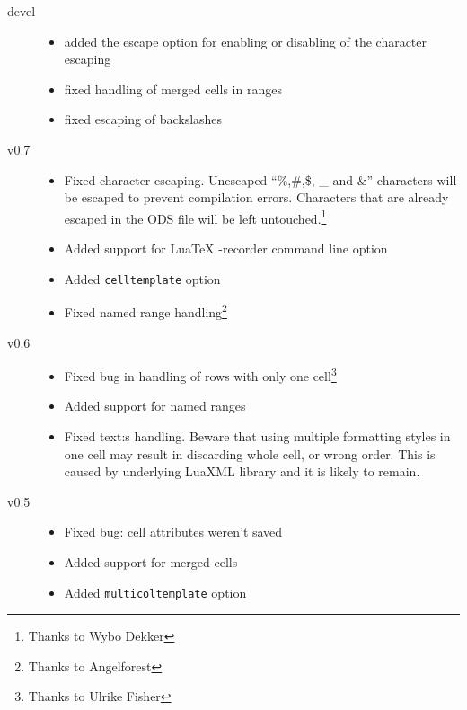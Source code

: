\documentclass{ltxdoc}
\begin{document}
\begin{description}
  \item[devel]
    \begin{itemize}
      \item added the escape option for enabling or disabling of the character escaping
      \item fixed handling of merged cells in ranges
      \item fixed escaping of backslashes
    \end{itemize}
   \item[v0.7]
     \begin{itemize}
       \item Fixed character escaping. Unescaped ``\%,\#,\$, \_ and \&'' characters will be escaped to prevent compilation errors.
        Characters that are already escaped in the ODS file will be left untouched.\footnote{Thanks to Wybo Dekker} 
         \item Added support for LuaTeX -recorder command line option
       \item Added \texttt{celltemplate} option
       \item Fixed named range handling\footnote{Thanks to Angelforest}
     \end{itemize}

\item[v0.6]
  \begin{itemize}
    \item  Fixed bug in handling of rows with only one cell\footnote{Thanks to Ulrike Fisher}
    \item  Added support for named ranges
    \item  Fixed text:s handling. Beware that using multiple formatting styles
      in one cell may result in discarding whole cell, or wrong order. This is
      caused by underlying LuaXML library and it is likely to remain.
\end{itemize}
\item[v0.5]
\begin{itemize}
  \item Fixed bug: cell attributes weren't saved
  \item Added support for merged cells
  \item Added \texttt{multicoltemplate} option
\end{itemize}


\end{description}
\end{document}
